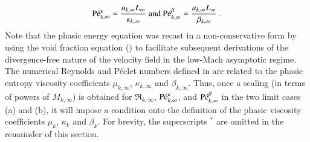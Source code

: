 \documentclass[preprint,10pt]{elsarticle}
\begin{document}
{\begin{equation}
\Pe_{k,\infty}^\kappa = \frac{u_{k,\infty} L_\infty}{\kappa_{k,\infty}} \text{ and }
\Pe_{k,\infty}^\beta = \frac{u_{k,\infty} L_\infty}{\beta_{k,\infty}} \ .
\end{equation}
%
Note that the phasic energy equation was recast in a non-conservative form by using the void fraction equation () to facilitate subsequent derivations of the divergence-free nature of the velocity field in the low-Mach asymptotic regime.
The numerical Reynolds and P\'eclet numbers defined in  are related to the phasic entropy 
viscosity coefficients $\mu_{k,\infty}$, $\kappa_{k,\infty}$ and $\beta_{k,\infty}$. Thus, once a scaling (in terms of powers of $M_{k,\infty}$) 
is obtained for $\Re_{k,\infty}$, $\textrm{P\'e}_{k,\infty}^\kappa$, and $\textrm{P\'e}_{k,\infty}^\beta$ in the two limit cases (a) and (b), it will impose a condition onto the definition of the phasic viscosity coefficients $\mu_k$, $\kappa_k$ and $\beta_k$. For brevity, the superscripts $^*$ are omitted in the remainder of this section.   

}
\end{document}
